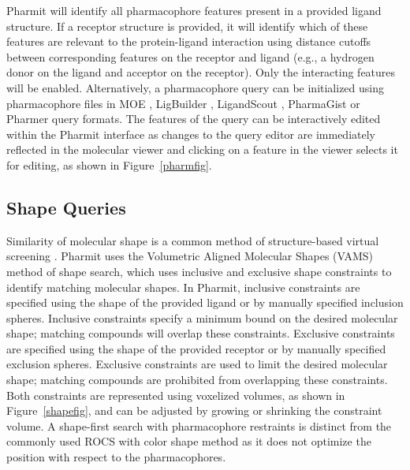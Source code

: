 Pharmit will identify all pharmacophore features present in a provided ligand structure. If a receptor structure is provided, it will identify which of these features are relevant to the protein-ligand interaction using distance cutoffs between corresponding features on the receptor and ligand (e.g., a hydrogen donor on the ligand and acceptor on the receptor). Only the interacting features will be enabled. Alternatively, a pharmacophore query can be initialized using pharmacophore files in MOE \cite{moe}, LigBuilder \cite{Wang_2000}, LigandScout \cite{Wolber_2005}, PharmaGist \cite{Schneidman_Duhovny_2008} or Pharmer \cite{Koes_2011} query formats.  The features of the query can be interactively edited within the Pharmit interface as changes to the query editor are immediately reflected in the molecular viewer and clicking on a feature in the viewer selects it for editing, as shown in Figure~\ref{pharmfig}.

\subsection{Shape Queries}

Similarity of molecular shape is a common method of structure-based virtual screening \cite{Nicholls_2010}.  Pharmit uses the Volumetric Aligned Molecular Shapes (VAMS) \cite{vams} method of shape search, which uses inclusive and exclusive shape constraints to identify matching molecular shapes.  In Pharmit, inclusive constraints are specified using the shape of the provided ligand or by manually specified inclusion spheres. Inclusive constraints specify a minimum bound on the desired molecular shape; matching compounds will overlap these constraints. Exclusive constraints are specified using the shape of the provided receptor or by manually specified exclusion spheres.  Exclusive constraints are used to limit the desired molecular shape; matching compounds are prohibited from overlapping these constraints.  Both constraints are represented using voxelized volumes, as shown in Figure~\ref{shapefig}, and can be adjusted by growing or shrinking the constraint volume. A shape-first search with pharmacophore restraints is distinct from the commonly used ROCS with color shape method \cite{Hawkins_2007} as it does not optimize the position with respect to the pharmacophores.

